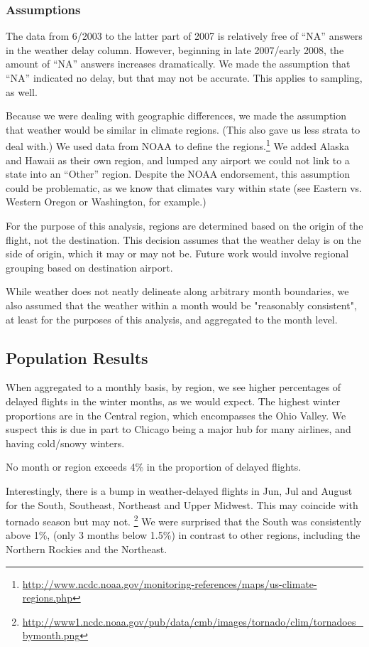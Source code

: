 \documentclass{article}
\begin{document}
\subsubsection{Assumptions}
The data from 6/2003 to the latter part of 2007 is relatively free of ``NA'' answers in the weather delay column. However, beginning in late 2007/early 2008, the amount of ``NA'' answers increases dramatically. We made the assumption that ``NA'' indicated no delay, but that may not be accurate. This applies to sampling, as well.

Because we were dealing with geographic differences, we made the assumption that weather would be similar in climate regions. (This also gave us less strata to deal with.) We used data from NOAA to define the regions.\footnote{\url{http://www.ncdc.noaa.gov/monitoring-references/maps/us-climate-regions.php}} We added Alaska and Hawaii as their own region, and lumped any airport we could not link to a state into an ``Other'' region. Despite the NOAA endorsement, this assumption could be problematic, as we know that climates vary within state (see Eastern vs. Western Oregon or Washington, for example.) 

For the purpose of this analysis, regions are determined based on the origin of the flight, not the destination. This decision assumes that the weather delay is on the side of origin, which it may or may not be. Future work would involve regional grouping based on destination airport.

While weather does not neatly delineate along arbitrary month boundaries, we also assumed that the weather within a month would be "reasonably consistent", at least for the purposes of this analysis, and aggregated to the month level.



\subsection{Population Results}
When aggregated to a monthly basis, by region, we see higher percentages of delayed flights in the winter months, as we would expect. The highest winter proportions are in the Central region, which encompasses the Ohio Valley. We suspect this is due in part to Chicago being a major hub for many airlines, and having cold/snowy winters.

No month or region exceeds 4\% in the proportion of delayed flights.

Interestingly, there is a bump in weather-delayed flights in Jun, Jul and August for the South, Southeast, Northeast and Upper Midwest. This may coincide with tornado season but may not. \footnote{\url{http://www1.ncdc.noaa.gov/pub/data/cmb/images/tornado/clim/tornadoes_bymonth.png}} We were surprised that the South was consistently above 1\%, (only 3 months below 1.5\%) in contrast to other regions, including the Northern Rockies and the Northeast.
\end{document}
